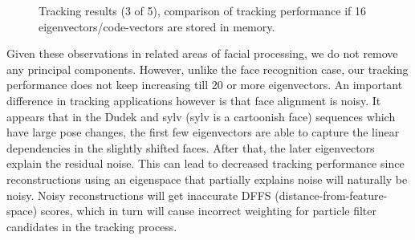 								\begin{figure}[t]
								\centering
								
								\caption{Tracking results (3 of 5), comparison of tracking performance if 16 eigenvectors/code-vectors are stored in memory.}
								\label{fig:results_final_3_16}
								\end{figure}

Given these observations in related areas of facial processing, we do not remove any principal components.  However, unlike the face recognition case, our tracking performance does not keep increasing till 20 or more eigenvectors.  An important difference in tracking applications however is that face alignment is noisy.  It appears that in the Dudek and sylv (sylv is a cartoonish face) sequences which have large pose changes, the first few eigenvectors are able to capture the linear dependencies in the slightly shifted faces.  After that, the later eigenvectors explain the residual noise.  This can lead to decreased tracking performance since reconstructions using an eigenspace that partially explains noise will naturally be noisy.  Noisy reconstructions will get inaccurate DFFS (distance-from-feature-space) scores, which in turn will cause incorrect weighting for particle filter candidates in the tracking process.

